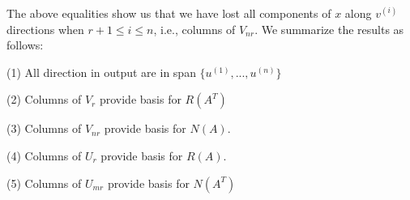 The above equalities show us that we have lost all components of $x$ along $v^{(i)}$ directions when $r+1 \leq i \leq n$, i.e., columns of $V_{nr}$. We summarize the results as follows:

(1) All direction in output are in span $\{u^{(1)} ,..., u^{(n)}\}$

(2) Columns of $V_{r}$ provide basis for $R(A^T)$

(3) Columns of $V_{nr}$ provide basis for $N(A)$.

(4) Columns of $U_r$ provide basis for $R(A)$.

(5) Columns of $U_{mr}$ provide basis for $N(A^T)$









